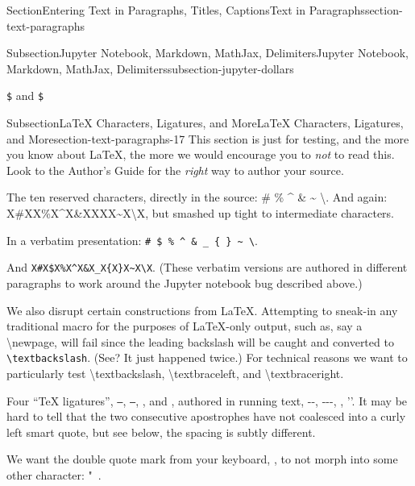 \documentclass[twoside,10pt,]{article}
\newcommand{\mono}[1]{\texttt{#1}}
\numberwithin{equation}{section}
\begin{document}
\begin{sectionptx}{Section}{Entering Text in Paragraphs, Titles, Captions}{}{Text in Paragraphs}{}{}{section-text-paragraphs}
\begin{subsectionptx}{Subsection}{Jupyter Notebook, Markdown, MathJax, Delimiters}{}{Jupyter Notebook, Markdown, MathJax, Delimiters}{}{}{subsection-jupyter-dollars}
\par
\mono{\$} and \mono{\$}%
\end{subsectionptx}
%
%
\typeout{************************************************}
\typeout{************************************************}
%
\begin{subsectionptx}{Subsection}{\LaTeX{} Characters, Ligatures, and More}{}{\LaTeX{} Characters, Ligatures, and More}{}{}{section-text-paragraphs-17}
This section is just for testing, and the more you know about \LaTeX{}, the more we would encourage you to \emph{not} to read this.  Look to the Author's Guide for the \emph{right} way to author your source.%
\par
The ten reserved characters, directly in the source: \# \textdollar{} \% \textasciicircum{} \& \textunderscore{} \textbraceleft{} \textbraceright{} \textasciitilde{} \textbackslash{}.  And again: X\#X\textdollar{}X\%X\textasciicircum{}X\&X\textunderscore{}X\textbraceleft{}X\textbraceright{}X\textasciitilde{}X\textbackslash{}X, but smashed up tight to intermediate characters.%
\par
In a verbatim presentation: \mono{\# \$ \% \textasciicircum{} \& \_ \{ \} \textasciitilde{} \textbackslash{}}.%
\par
And \mono{X\#X\$X\%X\textasciicircum{}X\&X\_X\{X\}X\textasciitilde{}X\textbackslash{}X}.  (These verbatim versions are authored in different paragraphs to work around the Jupyter notebook bug described above.)%
\par
We also disrupt certain constructions from \LaTeX{}.  Attempting to sneak-in any traditional macro for the purposes of \LaTeX{}-only output, such as, say a \textbackslash{}newpage, will fail since the leading backslash will be caught and converted to \mono{\textbackslash{}textbackslash}.  (See?  It just happened twice.)  For technical reasons we want to particularly test \textbackslash{}textbackslash, \textbackslash{}textbraceleft, and \textbackslash{}textbraceright.%
\par
Four ``\TeX{} ligatures'', \mono{--}, \mono{---}, \mono{\textasciigrave{}\textasciigrave{}}, and \mono{\textquotesingle{}\textquotesingle{}}, authored in running text, -{}-{}, -{}-{}-, \textasciigrave{}\textasciigrave{}, '{}'{}.  It may be hard to tell that the two consecutive apostrophes have not coalesced into a curly left smart quote, but see below, the spacing is subtly different.%
\par
We want the double quote mark from your keyboard, \mono{\textquotedbl{}}, to not morph into some other character: "~.%

\end{subsectionptx}
\end{sectionptx}
\end{document}
